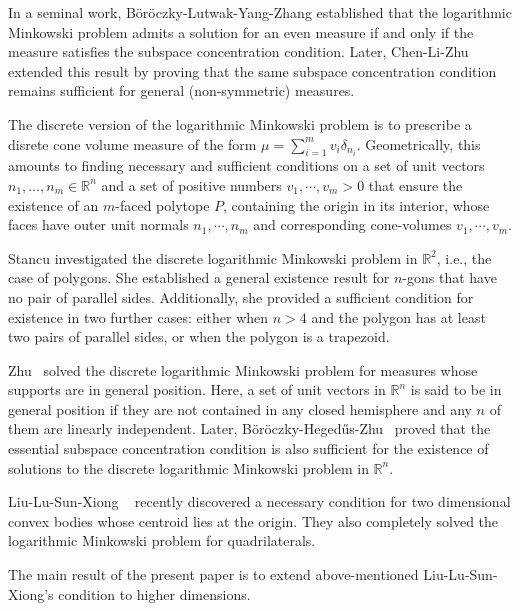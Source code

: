 \documentclass[12pt]{amsart}
\numberwithin{equation}{section}
\numberwithin{lemma}{section}
\numberwithin{proposition}{section}
\numberwithin{corollary}{section}
\numberwithin{remark}{section}
\begin{document}
In a seminal work\cite{BLYZ}, Böröczky-Lutwak-Yang-Zhang established that the logarithmic \newline 
Minkowski problem admits a solution for an even measure if and only if the measure satisfies the subspace concentration condition. 
Later, Chen-Li-Zhu\cite{CLZ} extended this result by proving that the same subspace concentration condition remains sufficient for general (non-symmetric) measures.

The discrete version of the logarithmic Minkowski problem is to prescribe a disrete  cone volume measure of the form $\mu= \sum_{i=1}^m v_i \delta_{n_i}$. Geometrically, this amounts to finding necessary and sufficient conditions on a set of unit vectors $n_1, \dots, n_m \in \mathbb{R}^n$ and a set of positive numbers $v_1, \cdots, v_m>0 $ that ensure the existence of an $m$-faced polytope $P$, containing the origin in its interior, whose faces have outer unit normals $n_1, \cdots, n_m$ and corresponding cone-volumes $v_1, \cdots, v_m$.

Stancu \cite{S1} investigated the discrete logarithmic Minkowski problem in $ \mathbb{R}^2$, i.e., the case of polygons. She established a general existence result for $n$-gons that have no pair of parallel sides. Additionally, she provided a sufficient condition for existence in two further cases: either when $n>4$ and the polygon has at least two pairs of parallel sides, or when the polygon is a trapezoid.

Zhu~\cite{Z} solved the discrete logarithmic Minkowski problem for measures whose supports are in general position. Here, a set of unit vectors in $\mathbb{R}^n$ is said to be in general position if they are not contained in any closed hemisphere and any $n$ of them are linearly independent. Later, Böröczky-Hegedűs-Zhu~\cite{BHZ} proved that the essential subspace concentration condition is also sufficient for the existence of solutions to the discrete logarithmic Minkowski problem in $\mathbb{R}^n$. 

Liu-Lu-Sun-Xiong ~\cite{LLSX} recently discovered a necessary condition for two dimensional convex bodies whose centroid lies at the origin. They also completely solved the logarithmic Minkowski problem for quadrilaterals.

The main result of the present paper is to extend above-mentioned Liu-Lu-Sun-Xiong's condition to higher dimensions.  
\end{document}
